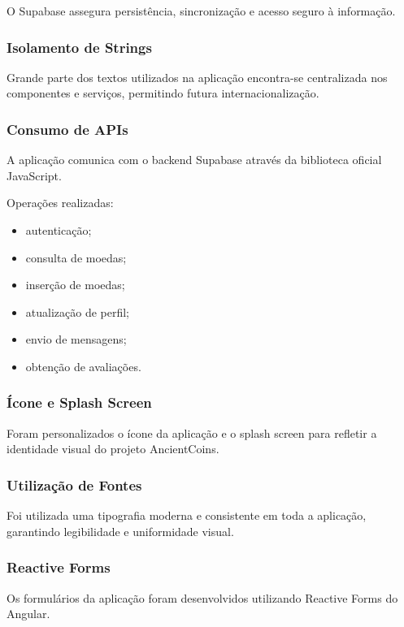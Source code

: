 \documentclass[12pt,a4paper]{article}
\begin{document}
O Supabase assegura persistência, sincronização e acesso seguro à informação.

\subsubsection{Isolamento de Strings}

Grande parte dos textos utilizados na aplicação encontra-se centralizada nos componentes e serviços, permitindo futura internacionalização.

\subsubsection{Consumo de APIs}

A aplicação comunica com o backend Supabase através da biblioteca oficial JavaScript.

Operações realizadas:

\begin{itemize}
\setlength{\itemsep}{0.15em}
\item autenticação;
\item consulta de moedas;
\item inserção de moedas;
\item atualização de perfil;
\item envio de mensagens;
\item obtenção de avaliações.
\end{itemize}

\subsubsection{Ícone e Splash Screen}

Foram personalizados o ícone da aplicação e o splash screen para refletir a identidade visual do projeto AncientCoins.

\subsubsection{Utilização de Fontes}

Foi utilizada uma tipografia moderna e consistente em toda a aplicação, garantindo legibilidade e uniformidade visual.

\subsubsection{Reactive Forms}

Os formulários da aplicação foram desenvolvidos utilizando Reactive Forms do Angular.
\end{document}
